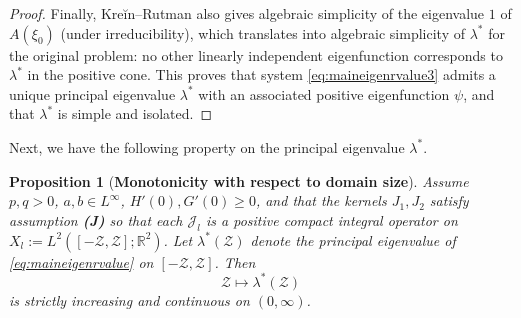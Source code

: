 \documentclass[a4paper,11pt]{amsart}
\newtheorem{proposition}[theorem]{Proposition}
\theoremstyle{definition}
\numberwithin{equation}{section}
\theoremstyle{definition}
\begin{document}
\begin{proof}
Finally, Kreĭn--Rutman also gives algebraic simplicity of the eigenvalue \(1\) of \(A(\xi_0)\) (under irreducibility), which translates into algebraic simplicity of \(\lambda^\ast\) for the original problem: no other linearly independent eigenfunction corresponds to \(\lambda^\ast\) in the positive cone. This proves that system \eqref{eq:maineigenrvalue3} admits a unique principal eigenvalue \(\lambda^\ast\) with an associated positive eigenfunction \(\psi\), and that \(\lambda^\ast\) is simple and isolated.
\end{proof}



Next, we have the following property on the principal eigenvalue $\lambda^\ast.$


\begin{proposition}[\textbf{Monotonicity with respect to domain size}]\label{prop:monotonicity}
Assume $p,q>0$, $a,b\in L^\infty$, $H'(0),G'(0)\geq0$, and that the kernels $J_1, J_2$ satisfy assumption \textbf{(J)} so that each $\mathscr J_l$ is a positive compact integral operator on $X_l:=L^2([-\mathcal{Z}, \mathcal{Z}];\mathbb R^2)$.
Let $\lambda^\ast(\mathcal{Z})$ denote the principal eigenvalue of \eqref{eq:maineigenrvalue} on $[-\mathcal{Z}, \mathcal{Z}]$. Then
\[
\mathcal{Z}\longmapsto \lambda^\ast(\mathcal{Z})
\]
is strictly increasing and continuous on $(0,\infty)$.
\end{proposition}
\end{document}
